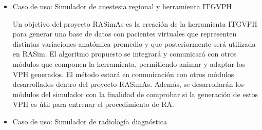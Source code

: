 \begin{itemize}





\begin{itemize}
    \item 	Caso de uso: Simulador de anestesia regional y herramienta \ac{ITGVPH}
    
    Un objetivo del proyecto \ac{RASimAs} es la creación de la herramienta \ac{ITGVPH} para generar una base de datos con pacientes virtuales que representen distintas variaciones anatómica promedio y que posteriormente será utilizada en \ac{RASim}.
    El algoritmo propuesto se integrará y comunicará con otros módulos que componen la herramienta, permitiendo animar y adaptar los \ac{VPH} generados. El método estará en comunicación con otros módulos desarrollados dentro del proyecto \ac{RASimAs}. Además, se desarrollarán los módulos del simulador con la finalidad de comprobar si la generación de estos \ac{VPH} es útil para entrenar el procedimiento de \ac{RA}.
    


    

    \item Caso de uso: Simulador de radiología diagnóstica


\end{itemize}
\end{itemize}
